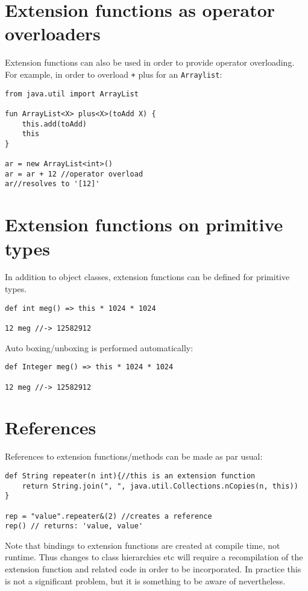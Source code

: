 \documentclass[conc-doc]{subfiles}
\begin{document}
\section{Extension functions as operator overloaders}
\label{sec:extfunAsOpOver}
Extension functions can also be used in order to provide operator overloading. For example, in order to overload \lstinline{+} plus for an \lstinline{Arraylist}:

\begin{lstlisting}
from java.util import ArrayList

fun ArrayList<X> plus<X>(toAdd X) {
	this.add(toAdd)
	this
}

ar = new ArrayList<int>()
ar = ar + 12 //operator overload
ar//resolves to '[12]'
\end{lstlisting}

\section{Extension functions on primitive types}
In addition to object classes, extension functions can be defined for primitive types.

\begin{lstlisting}
def int meg() => this * 1024 * 1024

12 meg //-> 12582912
\end{lstlisting}

Auto boxing/unboxing is performed automatically:

\begin{lstlisting}
def Integer meg() => this * 1024 * 1024

12 meg //-> 12582912
\end{lstlisting}

\section{References}
References to extension functions/methods can be made as par usual:
\begin{lstlisting}
def String repeater(n int){//this is an extension function
	return String.join(", ", java.util.Collections.nCopies(n, this))
}

rep = "value".repeater&(2) //creates a reference
rep() // returns: 'value, value'
\end{lstlisting}

Note that bindings to extension functions are created at compile time, not runtime. Thus changes to class hierarchies etc will require a recompilation of the extension function and related code in order to be incorporated. In practice this is not a significant problem, but it is something to be aware of nevertheless.
\end{document}
